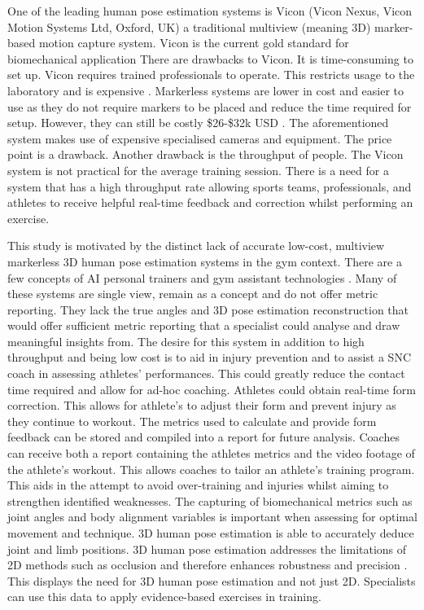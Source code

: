 One of the leading human pose estimation systems is Vicon (Vicon Nexus, Vicon Motion Systems Ltd, Oxford, UK) a traditional multiview (meaning 3D) marker-based motion capture system. Vicon is the current gold standard for biomechanical application \cite{Matsuda2025, Hansen2024, Song2022}
There are drawbacks to Vicon. It is time-consuming to set up. Vicon requires trained professionals to operate. This restricts usage to the laboratory and is expensive \cite{MercadalBaudart2024, Kuster2016}. 
Markerless systems are lower in cost and easier to use as they do not require markers to be placed and reduce the time required for setup. However, they can still be costly \$26-\$32k USD \cite{muir2021}.
The aforementioned system makes use of expensive specialised cameras and equipment. The price point is a drawback. Another drawback is the throughput of people. The Vicon system is not practical for the average training session. There is a need for a system that has a high throughput rate allowing sports teams, professionals, and athletes to receive helpful real-time feedback and correction whilst performing an exercise.

This study is motivated by the distinct lack of accurate low-cost, multiview markerless 3D human pose estimation systems in the gym context. There are a few concepts of AI personal trainers and gym assistant technologies \cite{Fieraru2021, appiah2024mobile, Chen2020, Dedhia2023}. Many of these systems are single view, remain as a concept and do not offer metric reporting. They lack the true angles and 3D pose estimation reconstruction that would offer sufficient metric reporting that a specialist could analyse and draw meaningful insights from.
The desire for this system in addition to high throughput and being low cost is to aid in injury prevention and to assist a SNC coach in assessing athletes' performances. This could greatly reduce the contact time required and allow for ad-hoc coaching. Athletes could obtain real-time form correction. This allows for athlete's to adjust their form and prevent injury as they continue to workout. The metrics used to calculate and provide form feedback can be stored and compiled into a report for future analysis. Coaches can receive both a report containing the athletes metrics and the video footage of the athlete's workout. This allows coaches to tailor an athlete's training program. This aids in the attempt to avoid over-training and injuries whilst aiming to strengthen identified weaknesses.
The capturing of biomechanical metrics such as joint angles and body alignment variables is important when assessing for optimal movement and technique. 3D human pose estimation is able to accurately deduce joint and limb positions. 3D human pose estimation addresses the limitations of 2D methods such as occlusion and therefore enhances robustness and precision \cite{Sun2025}.
This displays the need for 3D human pose estimation and not just 2D. Specialists can use this data to apply evidence-based exercises in training. 

